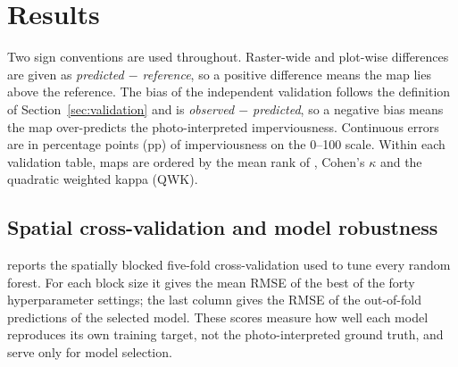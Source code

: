 %
%

\section{Results}
\label{sec:results}

Two sign conventions are used throughout. Raster-wide and plot-wise
differences are given as \emph{predicted $-$ reference}, so a positive
difference means the map lies above the reference. The bias of the
independent validation follows the definition of
Section~\ref{sec:validation} and is \emph{observed $-$ predicted}, so a
negative bias means the map over-predicts the photo-interpreted
imperviousness. Continuous errors are in percentage points (pp) of
imperviousness on the 0--100 scale. Within each validation table, maps are
ordered by the mean rank of \Rsq{}, Cohen's $\kappa$ and the quadratic
weighted kappa (QWK).

\subsection{Spatial cross-validation and model robustness}
\label{sec:res-cv}

 reports the spatially blocked five-fold cross-validation used
to tune every random forest. For each block size it gives the mean RMSE of
the best of the forty hyperparameter settings; the last column gives the RMSE
of the out-of-fold predictions of the selected model. These scores measure
how well each model reproduces its own training target, not the
photo-interpreted ground truth, and serve only for model selection.

